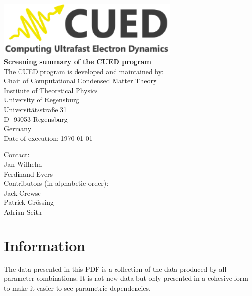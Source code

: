\documentclass[11pt, a4paper]{scrartcl}
\begin{document}

\begin{titlepage}
  \sffamily
  \begin{center}
{
\includegraphics[width=9cm]{logo.pdf}
\\[5em]
\Huge \bfseries Screening summary of the CUED program}
\\[3em]\large
The CUED program is developed and maintained by:
\\[3em]
Chair of Computational Condensed Matter Theory
  \\[0.5em]
Institute of Theoretical Physics
  \\[0.5em]
University of Regensburg
  \\[0.5em]
Universitätsstraße 31
  \\[0.5em]
D\,-\,93053 Regensburg
  \\[0.5em]
Germany
\\[3em]
Date of execution: \today
  \\[0.5em]
  \end{center}{\large
  Contact:
  \\[1em]
    Jan Wilhelm
      \\[0.5em]
    Ferdinand Evers
  \\[3em]
  Contributors (in alphabetic order): 
  \\[1em]
  Jack Crewse
  \\[0.5em]
  Patrick Grössing
  \\[0.5em]
  Adrian Seith
  }
\end{titlepage}

\pagestyle{plain}

\tableofcontents

\pagestyle{fancy}
\section{Information}
The data presented in this PDF is a collection of the data produced by all parameter combinations.
It is not new data but only presented in a cohesive form to make it easier to see parametric dependencies.
\end{document}
